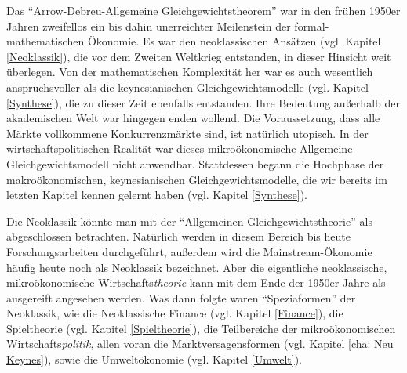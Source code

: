 Das "`Arrow-Debreu-Allgemeine Gleichgewichtstheorem"' war in den frühen 1950er Jahren zweifellos ein bis dahin unerreichter Meilenstein der formal-mathematischen Ökonomie. Es war den neoklassischen Ansätzen (vgl. Kapitel \ref{Neoklassik}), die vor dem Zweiten Weltkrieg entstanden, in dieser Hinsicht weit überlegen. Von der mathematischen Komplexität her war es auch wesentlich anspruchsvoller als die keynesianischen Gleichgewichtsmodelle (vgl. Kapitel \ref{Synthese}), die zu dieser Zeit ebenfalls entstanden. Ihre Bedeutung außerhalb der akademischen Welt war hingegen enden wollend. Die Voraussetzung, dass alle Märkte vollkommene Konkurrenzmärkte sind, ist natürlich utopisch. In der wirtschaftspolitischen Realität war dieses mikroökonomische Allgemeine Gleichgewichtsmodell nicht anwendbar. Stattdessen begann die Hochphase der makroökonomischen, keynesianischen Gleichgewichtsmodelle, die wir bereits im letzten Kapitel kennen gelernt haben (vgl. Kapitel \ref{Synthese}).

Die Neoklassik könnte man mit der "`Allgemeinen Gleichgewichtstheorie"' als abgeschlossen betrachten. Natürlich werden in diesem Bereich bis heute Forschungsarbeiten durchgeführt, außerdem wird die Mainstream-Ökonomie häufig heute noch als Neoklassik bezeichnet. Aber die eigentliche neoklassische, mikroökonomische Wirtschafts\textit{theorie} kann mit dem Ende der 1950er Jahre als ausgereift angesehen werden. Was dann folgte waren "`Speziaformen"' der Neoklassik, wie die Neoklassische Finance (vgl. Kapitel \ref{Finance}), die Spieltheorie (vgl. Kapitel \ref{Spieltheorie}), die Teilbereiche der mikroökonomischen Wirtschafts\textit{politik}, allen voran die Marktversagensformen (vgl. Kapitel \ref{cha: Neu Keynes}), sowie die Umweltökonomie (vgl. Kapitel \ref{Umwelt}).